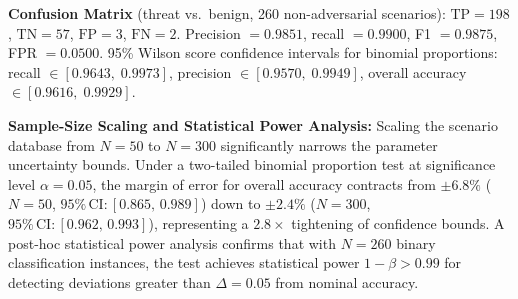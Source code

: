 \documentclass[journal]{IEEEtran}
\renewcommand{\_}{\textunderscore\allowbreak}
\begin{document}
\begin{table}[!t]
\caption{Edge-LLM Triage Evaluation Across 300 Labeled Scenarios}
\label{tab:llm_extended}
\centering
{}
\end{table}

\textbf{Confusion Matrix} (threat vs.~benign, 260 non-adversarial scenarios):
$\text{TP}=198$, $\text{TN}=57$, $\text{FP}=3$, $\text{FN}=2$. Precision $= 0.9851$, recall $= 0.9900$, F1 $= 0.9875$,
FPR $= 0.0500$. 95\% Wilson score confidence intervals for binomial proportions: recall $\in [0.9643,\; 0.9973]$,
precision $\in [0.9570,\; 0.9949]$, overall accuracy $\in [0.9616,\; 0.9929]$.

\textbf{Sample-Size Scaling and Statistical Power Analysis:}
Scaling the scenario database from $N=50$ to $N=300$ significantly narrows the parameter uncertainty bounds. Under a two-tailed binomial proportion test at significance level $\alpha = 0.05$, the margin of error for overall accuracy contracts from $\pm 6.8\%$ ($N=50$, $95\%\,\text{CI}: [0.865,\, 0.989]$) down to $\pm 2.4\%$ ($N=300$, $95\%\,\text{CI}: [0.962,\, 0.993]$), representing a $2.8\times$ tightening of confidence bounds. A post-hoc statistical power analysis confirms that with $N=260$ binary classification instances, the test achieves statistical power $1 - \beta > 0.99$ for detecting deviations greater than $\Delta = 0.05$ from nominal accuracy.
\end{document}
